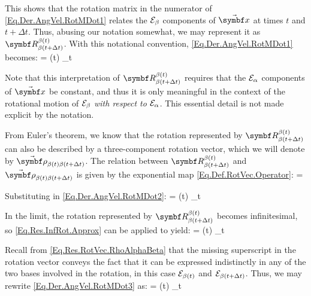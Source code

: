 This shows that the rotation matrix in the numerator of \eqref{Eq.Der.AngVel.RotMDot1} relates the $\basis[\beta]$ components of $\vabs{x}$ at times $t$ and $t + \Delta t$. Thus, abusing our notation somewhat, we may represent it as $\RotM{\beta(t)}{\beta(t+\Delta t)}$. With this notational convention, \eqref{Eq.Der.AngVel.RotMDot1} becomes:
{
\RotMDot{\alpha}{\beta} =  \RotM{\alpha}{\beta}(t) \lim_{\Delta t}  
}

Note that this interpretation of $\RotM{\beta(t)}{\beta(t+\Delta t)}$ requires that the $\basis[\alpha]$ components of $\vabs{x}$ be constant, and thus it is only meaningful in the context of the rotational motion of $\basis[\beta]$ \emph{with respect to $\basis[\alpha]$}. This essential detail is not made explicit by the notation.

From Euler's theorem, we know that the rotation represented by $\RotM{\beta(t)}{\beta(t+\Delta t)}$ can also be described by a three-component rotation vector, which we will denote by $\varel{\rotvecsymb}{\beta(t)}{\beta(t+\Delta t)}$. The relation between $\RotM{\beta(t)}{\beta(t+\Delta t)}$ and $\varel{\rotvecsymb}{\beta(t)}{\beta(t+\Delta t)}$ is given by the exponential map \eqref{Eq.Def.RotVec.Operator}:
{
 = 
}

Substituting in \eqref{Eq.Der.AngVel.RotMDot2}:
\eqnl
{
\RotMDot{\alpha}{\beta} = \RotM{\alpha}{\beta}(t) \lim_{\Delta t}  
}

In the limit, the rotation represented by $\RotM{\beta(t)}{\beta(t+\Delta t)}$ becomes infinitesimal, so \eqref{Eq.Res.InfRot.Approx} can be applied to yield:
{
\RotMDot{\alpha}{\beta} = \RotM{\alpha}{\beta}(t) \lim_{\Delta t} 
}

Recall from \eqref{Eq.Res.RotVec.RhoAlphaBeta} that the missing superscript in the rotation vector conveys the fact that it can be expressed indistinctly in any of the two bases involved in the rotation, in this case $\basis[\beta(t)]$ and $\basis[\beta(t+\Delta t)]$. Thus, we may rewrite \eqref{Eq.Der.AngVel.RotMDot3} as:
{
\RotMDot{\alpha}{\beta} = \RotM{\alpha}{\beta}(t) \lim_{\Delta t} 
}

